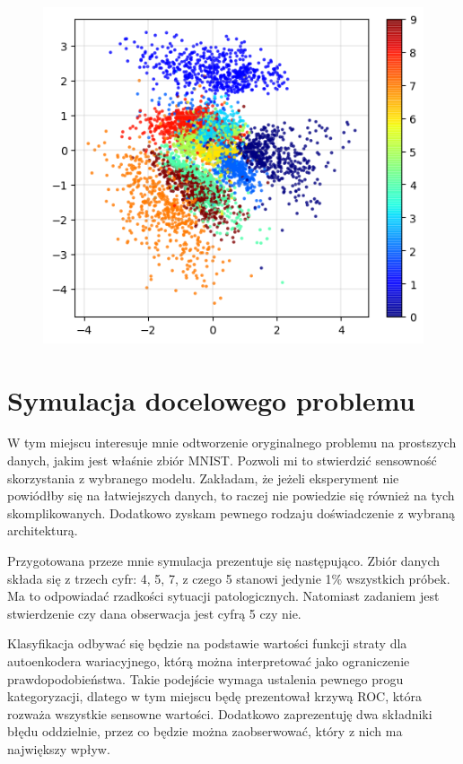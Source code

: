 \begin{figure}[h!]
    \centering
    \includegraphics[width=1.\textwidth]{images/mnist_2d}
    \caption{}
    \label{fig:mnist_2d}
\end{figure}

\section{Symulacja docelowego problemu}

W tym miejscu interesuje mnie odtworzenie oryginalnego problemu na prostszych danych, jakim jest właśnie zbiór MNIST. Pozwoli mi to stwierdzić sensowność skorzystania z wybranego modelu. Zakładam, że jeżeli eksperyment nie powiódłby się na łatwiejszych danych, to raczej nie powiedzie się również na tych skomplikowanych. Dodatkowo zyskam pewnego rodzaju doświadczenie z wybraną architekturą.

Przygotowana przeze mnie symulacja prezentuje się następująco. Zbiór danych składa się z trzech cyfr: 4, 5, 7, z czego 5 stanowi jedynie 1\% wszystkich próbek. Ma to odpowiadać rzadkości sytuacji patologicznych. Natomiast zadaniem jest stwierdzenie czy dana obserwacja jest cyfrą 5 czy nie.

Klasyfikacja odbywać się będzie na podstawie wartości funkcji straty dla autoenkodera wariacyjnego, którą można interpretować jako ograniczenie prawdopodobieństwa. Takie podejście wymaga ustalenia pewnego progu kategoryzacji, dlatego w tym miejscu będę prezentował krzywą ROC, która rozważa wszystkie sensowne wartości. Dodatkowo zaprezentuję dwa składniki błędu oddzielnie, przez co będzie można zaobserwować, który z nich ma największy wpływ.

